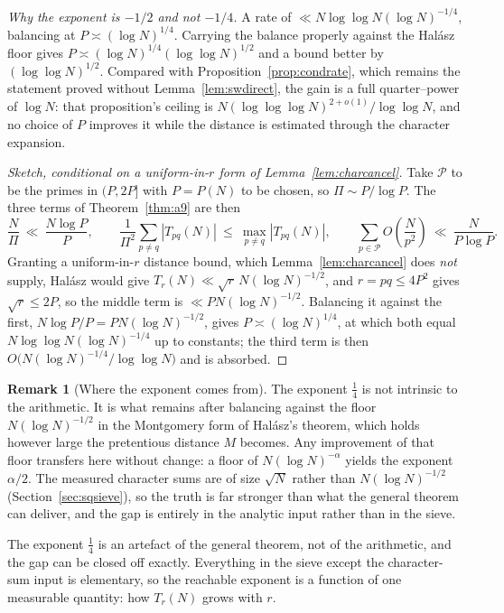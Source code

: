 \documentclass[11pt]{article}
\theoremstyle{definition}
\newtheorem{remark}[theorem]{Remark}
\begin{document}
\emph{Why the exponent is $-1/2$ and not $-1/4$.} A rate of $\ll N\log\log N(\log N)^{-1/4}$, balancing at $P\asymp(\log N)^{1/4}$. Carrying the balance properly against the Hal\'asz floor gives
$P\asymp(\log N)^{1/4}(\log\log N)^{1/2}$ and a bound better by $(\log\log N)^{1/2}$. Compared with
Proposition~\ref{prop:condrate}, which remains the statement proved without
Lemma~\ref{lem:swdirect}, the gain is a full quarter--power of $\log N$: that proposition's ceiling
is $N(\log\log\log N)^{2+o(1)}/\log\log N$, and no choice of $P$ improves it while the distance is
estimated through the character expansion.

\begin{proof}[Sketch, conditional on a uniform-in-$r$ form of Lemma~\ref{lem:charcancel}]
Take $\mathcal{P}$ to be the primes in $(P,2P]$ with $P=P(N)$ to be chosen, so
$\Pi\sim P/\log P$. The three terms of Theorem~\ref{thm:a9} are then
\[ \frac{N}{\Pi}\ \ll\ \frac{N\log P}{P},\qquad
   \frac1{\Pi^2}\sum_{p\neq q}|T_{pq}(N)|\ \le\ \max_{p\neq q}|T_{pq}(N)|,\qquad
   \sum_{p\in\mathcal{P}}O\!\left(\frac{N}{p^2}\right)\ \ll\ \frac{N}{P\log P}. \]
Granting a uniform-in-$r$ distance bound, which Lemma~\ref{lem:charcancel} does \emph{not}
supply, Hal\'asz would give
$T_r(N)\ll\sqrt r\,N(\log N)^{-1/2}$, and $r=pq\le4P^2$ gives $\sqrt r\le2P$, so the middle term is
$\ll PN(\log N)^{-1/2}$. Balancing it against the first,
$N\log P/P=PN(\log N)^{-1/2}$, gives $P\asymp(\log N)^{1/4}$, at which both equal
$N\log\log N(\log N)^{-1/4}$ up to constants; the third term is then $O\bigl(N(\log N)^{-1/4}/\log\log N\bigr)$
and is absorbed.
\end{proof}

\begin{remark}[Where the exponent comes from]\label{rem:rateexponent}
The exponent $\tfrac14$ is not intrinsic to the arithmetic. It is what remains after balancing
against the floor $N(\log N)^{-1/2}$ in the Montgomery form of Hal\'asz's theorem, which holds
however large the pretentious distance $M$ becomes. Any improvement of that floor transfers here
without change: a floor of $N(\log N)^{-\alpha}$ yields the exponent $\alpha/2$. The measured
character sums are of size $\sqrt N$ rather than $N(\log N)^{-1/2}$
(Section~\ref{sec:sqsieve}), so the truth is far stronger than what the general theorem can deliver,
and the gap is entirely in the analytic input rather than in the sieve.
\end{remark}

The exponent $\tfrac14$ is an artefact of the general theorem, not of the arithmetic, and the gap
can be closed off exactly. Everything in the sieve except the character-sum input is elementary, so
the reachable exponent is a function of one measurable quantity: how $T_r(N)$ grows with $r$.
\end{document}
